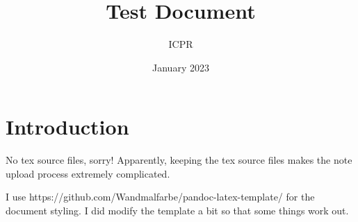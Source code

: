 \documentclass{article}
\title{Test Document}
\author{ICPR }
\date{January 2023}
\begin{document}
    \maketitle


    \section{Introduction}

    No tex source files, sorry! Apparently, keeping the tex source files makes the note upload process extremely complicated.

    I use https://github.com/Wandmalfarbe/pandoc-latex-template/ for the document styling. I did
    modify the template a bit so that some things work out.
\end{document}
